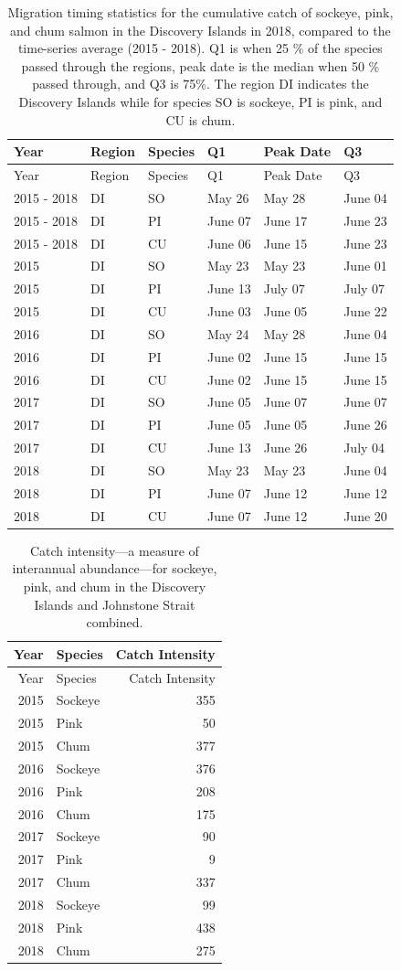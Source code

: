 \documentclass[fleqn,10pt]{wlpeerj} %
\begin{document}
\begin{longtable}[]{@{}llllll@{}}
\caption{\label{tab:mtdi} Migration timing statistics for the cumulative
catch of sockeye, pink, and chum salmon in the Discovery Islands in
2018, compared to the time-series average (2015 - 2018). Q1 is when 25
\% of the species passed through the regions, peak date is the median
when 50 \% passed through, and Q3 is 75\%. The region DI indicates the
Discovery Islands while for species SO is sockeye, PI is pink, and CU is
chum.}\tabularnewline
\toprule
Year & Region & Species & Q1 & Peak Date & Q3\tabularnewline
\midrule
\endfirsthead
\toprule
Year & Region & Species & Q1 & Peak Date & Q3\tabularnewline
\midrule
\endhead
2015 - 2018 & DI & SO & May 26 & May 28 & June 04\tabularnewline
2015 - 2018 & DI & PI & June 07 & June 17 & June 23\tabularnewline
2015 - 2018 & DI & CU & June 06 & June 15 & June 23\tabularnewline
2015 & DI & SO & May 23 & May 23 & June 01\tabularnewline
2015 & DI & PI & June 13 & July 07 & July 07\tabularnewline
2015 & DI & CU & June 03 & June 05 & June 22\tabularnewline
2016 & DI & SO & May 24 & May 28 & June 04\tabularnewline
2016 & DI & PI & June 02 & June 15 & June 15\tabularnewline
2016 & DI & CU & June 02 & June 15 & June 15\tabularnewline
2017 & DI & SO & June 05 & June 07 & June 07\tabularnewline
2017 & DI & PI & June 05 & June 05 & June 26\tabularnewline
2017 & DI & CU & June 13 & June 26 & July 04\tabularnewline
2018 & DI & SO & May 23 & May 23 & June 04\tabularnewline
2018 & DI & PI & June 07 & June 12 & June 12\tabularnewline
2018 & DI & CU & June 07 & June 12 & June 20\tabularnewline
\bottomrule
\end{longtable}

\begin{longtable}[]{@{}rlr@{}}
\caption{\label{tab:catch-intensity} Catch intensity---a measure of
interannual abundance---for sockeye, pink, and chum in the Discovery
Islands and Johnstone Strait combined.}\tabularnewline
\toprule
Year & Species & Catch Intensity\tabularnewline
\midrule
\endfirsthead
\toprule
Year & Species & Catch Intensity\tabularnewline
\midrule
\endhead
2015 & Sockeye & 355\tabularnewline
2015 & Pink & 50\tabularnewline
2015 & Chum & 377\tabularnewline
2016 & Sockeye & 376\tabularnewline
2016 & Pink & 208\tabularnewline
2016 & Chum & 175\tabularnewline
2017 & Sockeye & 90\tabularnewline
2017 & Pink & 9\tabularnewline
2017 & Chum & 337\tabularnewline
2018 & Sockeye & 99\tabularnewline
2018 & Pink & 438\tabularnewline
2018 & Chum & 275\tabularnewline
\bottomrule
\end{longtable}
\end{document}
